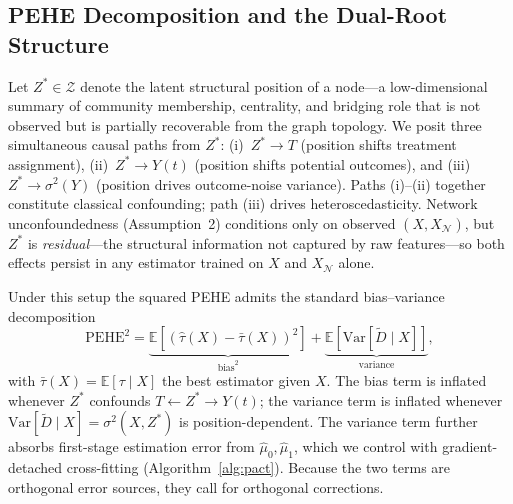 \documentclass[sigconf,anonymous,review]{acmart}
\begin{document}
\subsection{PEHE Decomposition and the Dual-Root Structure}\label{sec:theory}

Let $Z^* \in \mathcal{Z}$ denote the latent structural position of a node---a low-dimensional summary of community membership, centrality, and bridging role that is not observed but is partially recoverable from the graph topology. We posit three simultaneous causal paths from $Z^*$: (i)~$Z^* \to T$ (position shifts treatment assignment), (ii)~$Z^* \to Y(t)$ (position shifts potential outcomes), and (iii)~$Z^* \to \sigma^2(Y)$ (position drives outcome-noise variance). Paths (i)--(ii) together constitute classical confounding; path (iii) drives heteroscedasticity. Network unconfoundedness (Assumption~2) conditions only on observed $(X, X_{\mathcal{N}})$, but $Z^*$ is \emph{residual}---the structural information not captured by raw features---so both effects persist in any estimator trained on $X$ and $X_{\mathcal{N}}$ alone.

Under this setup the squared PEHE admits the standard bias--variance decomposition
\begin{equation}\label{eq:pehe_decomp}
    \mathrm{PEHE}^2 = \underbrace{\mathbb{E}\!\left[(\hat{\tau}(X) - \bar{\tau}(X))^2\right]}_{\text{bias}^2} + \underbrace{\mathbb{E}\!\left[\mathrm{Var}[\tilde{D} \mid X]\right]}_{\text{variance}},
\end{equation}
with $\bar{\tau}(X) = \mathbb{E}[\tau \mid X]$ the best estimator given $X$. The bias term is inflated whenever $Z^*$ confounds $T \leftarrow Z^* \to Y(t)$; the variance term is inflated whenever $\mathrm{Var}[\tilde{D} \mid X] = \sigma^2(X, Z^*)$ is position-dependent. The variance term further absorbs first-stage estimation error from $\hat{\mu}_0, \hat{\mu}_1$, which we control with gradient-detached cross-fitting (Algorithm~\ref{alg:pact}). Because the two terms are orthogonal error sources, they call for orthogonal corrections.
\end{document}
